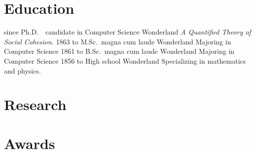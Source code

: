 \documentclass[a4]{resume} %
\begin{document}

\section{\bfseries{Education}}

\begin{sidebarlonglist} %
  \sidebarlonglistitem
    {since}
    {Ph.D.\ \normalfont\ candidate in Computer Science}
    {Wonderland}
    {\emph{A Quantified Theory of Social Cohesion.}}
  \sidebarlonglistitem
    {1863 to}
    {M.Sc.\ magna cum laude}
    {Wonderland}
    {Majoring in Computer Science}
  \sidebarlonglistitem
    {1861 to}
    {B.Sc.\ magna cum laude}
    {Wonderland}
    {Majoring in Computer Science}
  \sidebarlonglistitem
    {1856 to}
    {High school}
    {Wonderland}
    {Specializing in mathematics and physics.}
\end{sidebarlonglist}


\section{\bfseries{Research}}

\begin{sidebarshortlist} %
\end{sidebarshortlist}
 

\section{\bfseries{Awards}}
\end{document}
